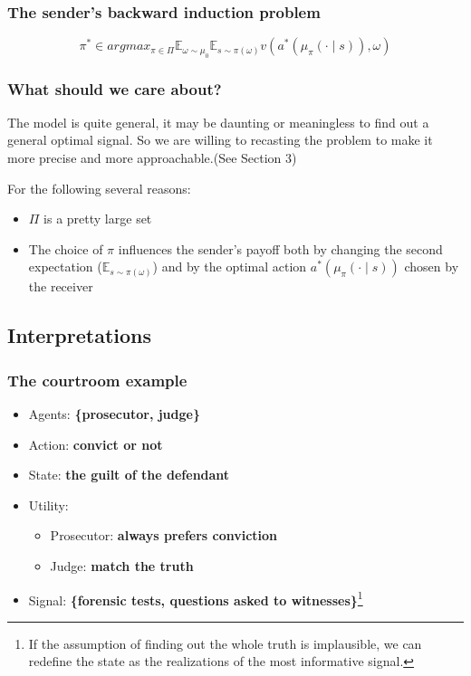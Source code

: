 \documentclass[12pt,letterpaper]{article}
\theoremstyle{definition}   %
\begin{document}
\subsubsection*{The sender's backward induction problem}

\begin{equation}
	\label{Equation 1}
	\pi^* \in argmax_{\pi \in \Pi} \mathbb{E}_{\omega \sim \mu_{0}} \mathbb{E}_{s \sim \pi(\omega)} v\left(a^{*}\left(\mu_{\pi}(\cdot \mid s)\right), \omega\right)
\end{equation}


\subsubsection*{What should we care about?}

The model is quite general, it may be daunting or meaningless to find out a general optimal signal. 
So we are willing to recasting the problem to make it more precise and more approachable.(See Section 3)

\vspace{0.5cm}

For the following several reasons:
\begin{itemize}
	\item $\Pi$ is a pretty large set
	\item The choice of $\pi$ influences the sender's payoff both by changing the second expectation ($\mathbb{E}_{s \sim \pi(\omega)}$) and by the optimal action $a^{*}\left(\mu_{\pi}(\cdot \mid s)\right)$ chosen by the receiver
\end{itemize}

\subsection{Interpretations}

\subsubsection*{The courtroom example}

\begin{itemize}
	\item Agents: \textbf{\{prosecutor, judge\}}
	\item Action: \textbf{convict or not}
	\item State: \textbf{the guilt of the defendant}
	\item Utility:
	      \begin{itemize}
			  \item Prosecutor: \textbf{always prefers conviction}
			  \item Judge: \textbf{match the truth}
		  \end{itemize}
	\item Signal: \textbf{\{forensic tests, questions asked to witnesses\}}\footnote{If the assumption of finding out the whole truth is implausible, we can redefine the state as the realizations of the most informative signal.}
\end{itemize}
\end{document}

